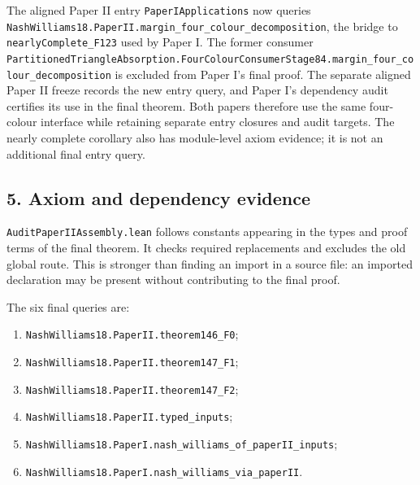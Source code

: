 \documentclass[english,11pt,a4paper]{article}
\providecommand{\tightlist}{\setlength{\itemsep}{0pt}\setlength{\parskip}{0pt}}
\begin{document}
The aligned Paper II entry \texttt{Paper\allowbreak{}IApplications} now queries \texttt{Nash\allowbreak{}Williams18.\allowbreak{}Paper\allowbreak{}II.\allowbreak{}margin\_\allowbreak{}four\_\allowbreak{}colour\_\allowbreak{}decomposition}, the bridge to \texttt{nearly\allowbreak{}Complete\_\allowbreak{}F123} used by Paper I. The former consumer \texttt{Partitioned\allowbreak{}Triangle\allowbreak{}Absorption.\allowbreak{}Four\allowbreak{}Colour\allowbreak{}Consumer\allowbreak{}Stage84.\allowbreak{}margin\_\allowbreak{}four\_\allowbreak{}colour\_\allowbreak{}decomposition} is excluded from Paper I's final proof. The separate aligned Paper II freeze records the new entry query, and Paper I's dependency audit certifies its use in the final theorem. Both papers therefore use the same four-colour interface while retaining separate entry closures and audit targets. The nearly complete corollary also has module-level axiom evidence; it is not an additional final entry query.


\subsection{5. Axiom and dependency evidence}\label{axiom-and-dependency-evidence}

\texttt{Audit\allowbreak{}Paper\allowbreak{}IIAssembly.\allowbreak{}lean} follows constants appearing in the types and proof terms of the final theorem. It checks required replacements and excludes the old global route. This is stronger than finding an import in a source file: an imported declaration may be present without contributing to the final proof.

The six final queries are:

\begin{enumerate}
\def\labelenumi{\arabic{enumi}.}
\tightlist
\item
  \texttt{Nash\allowbreak{}Williams18.\allowbreak{}Paper\allowbreak{}II.\allowbreak{}theorem146\_\allowbreak{}F0};
\item
  \texttt{Nash\allowbreak{}Williams18.\allowbreak{}Paper\allowbreak{}II.\allowbreak{}theorem147\_\allowbreak{}F1};
\item
  \texttt{Nash\allowbreak{}Williams18.\allowbreak{}Paper\allowbreak{}II.\allowbreak{}theorem147\_\allowbreak{}F2};
\item
  \texttt{Nash\allowbreak{}Williams18.\allowbreak{}Paper\allowbreak{}II.\allowbreak{}typed\_\allowbreak{}inputs};
\item
  \texttt{Nash\allowbreak{}Williams18.\allowbreak{}Paper\allowbreak{}I.\allowbreak{}nash\_\allowbreak{}williams\_\allowbreak{}of\_\allowbreak{}paper\allowbreak{}II\_\allowbreak{}inputs};
\item
  \texttt{Nash\allowbreak{}Williams18.\allowbreak{}Paper\allowbreak{}I.\allowbreak{}nash\_\allowbreak{}williams\_\allowbreak{}via\_\allowbreak{}paper\allowbreak{}II}.
\end{enumerate}
\end{document}
